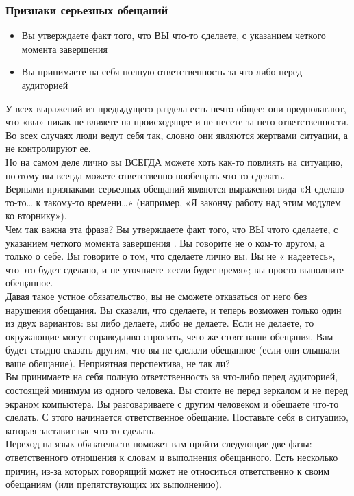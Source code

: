 \documentclass{../industrial-development}
\begin{document}
\begin{frame} \frametitle{Признаки серьезных обещаний}
\begin{itemize}
	\item Вы утверждаете факт того, что ВЫ что-то сделаете, с указанием четкого момента завершения
	\item Вы принимаете на себя полную ответственность за что-либо перед аудиторией
\end{itemize}
\end{frame}
\lecturenotes
У всех выражений из предыдущего раздела есть нечто общее: они предполагают, что «вы» никак не влияете на происходящее и не несете за него ответственности. Во всех случаях люди ведут себя так, словно они являются жертвами ситуации, а не контролируют ее.\\
Но на самом деле лично вы ВСЕГДА можете хоть как-то повлиять на ситуацию, поэтому вы всегда можете ответственно пообещать что-то сделать.\\
Верными признаками серьезных обещаний являются выражения вида «Я сделаю то-то… к такому-то времени…» (например, «Я закончу работу над этим модулем ко вторнику»).\\
Чем так важна эта фраза? Вы утверждаете факт того, что ВЫ чтото сделаете, с указанием четкого момента завершения . Вы говорите не о ком-то другом, а только о себе. Вы говорите о том, что сделаете лично вы. Вы не « надеетесь», что это будет сделано, и не уточняете «если будет время»; вы просто выполните обещанное.\\
Давая такое устное обязательство, вы не сможете отказаться от него без нарушения обещания. Вы сказали, что сделаете, и теперь возможен только один из двух вариантов: вы либо делаете, либо не делаете. Если не делаете, то окружающие могут справедливо спросить, чего же стоят ваши обещания. Вам будет стыдно сказать другим, что вы не сделали обещанное (если они слышали ваше обещание). Неприятная перспектива, не так ли?\\
Вы принимаете на себя полную ответственность за что-либо перед аудиторией, состоящей минимум из одного человека. Вы стоите не
перед зеркалом и не перед экраном компьютера. Вы разговариваете с другим человеком и обещаете что-то сделать. С этого  начинается ответственное обещание. Поставьте себя в ситуацию, которая заставит вас что-то сделать.\\
Переход на язык обязательств поможет вам пройти следующие две фазы: ответственного отношения к словам и выполнения обещанного. Есть несколько причин, из-за которых говорящий может не относиться ответственно к своим обещаниям (или препятствующих их выполнению).
\end{document}
